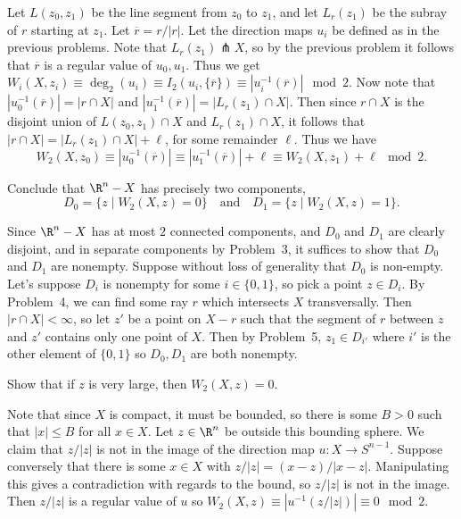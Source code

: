 \documentclass[11pt,letterpaper]{article}
\begin{document}
\begin{solution}
    \quad Let $L(z_0, z_1)$ be the line segment from $z_0$ to $z_1$, and let $L_r(z_1)$ be the subray of $r$ starting at $z_1$. Let $\overline{r}= r / |r|$. Let the direction maps $u_i$ be defined as in the previous problems. Note that $L_r(z_1)\pitchfork X$, so by the previous problem it follows that $\overline{r}$ is a regular value of $u_0, u_1$. Thus we get $W_i(X, z_i)\equiv \deg_2(u_i)\equiv I_2(u_i, \{\overline{r}\})\equiv |u_i^{-1}(\overline{r})|\mod 2$. Now note that $|u_0^{-1}(\overline{r})| = |r\cap X|$ and $|u_1^{-1}(\overline{r})| = |L_r(z_1) \cap X|$. Then since $r \cap X$ is the disjoint union of $L(z_0, z_1) \cap X$ and $L_r(z_1) \cap X$, it follows that $|r \cap X| = |L_r(z_1) \cap X|+\ell$, for some remainder $\ell$. Thus we have
    \[
    W_2(X,z_0) \equiv |u_0^{-1}(\overline{r})| \equiv |u_1^{-1}(\overline{r})|+\ell \equiv W_2(X,z_1)+\ell \mod 2.
    \]    
\end{solution}

\begin{problem}
Conclude that $\R^n-X$ has precisely two components,
\[
    D_0 = \{z \mid W_2(X,z)=0\}\quad\text{and}\quad D_1 = \{z \mid W_2(X,z)=1\}.
\]
\end{problem}

\begin{solution}
    \quad Since $\R^n-X$ has at most $2$ connected components, and $D_0$ and $D_1$ are clearly disjoint, and in separate components by Problem~3, it suffices to show that $D_0$ and $D_1$ are nonempty. Suppose without loss of generality that $D_0$ is non-empty. Let's suppose $D_i$ is nonempty for some $i\in \{0,1\}$, so pick a point $z\in D_i$. By Problem~4, we can find some ray $r$ which intersects $X$ transversally. Then $|r\cap X|<\infty$, so let $z'$ be a point on $X-r$ such that the segment of $r$ between $z$ and $z'$ contains only one point of $X$. Then by Problem~5, $z_1\in D_{i'}$ where $i'$ is the other element of $\{0,1\}$ so $D_0, D_1$ are both nonempty.
\end{solution}
    
\begin{problem}
Show that if $z$ is very large, then $W_2(X,z)=0$.
\end{problem}

\begin{solution}
    \quad Note that since $X$ is compact, it must be bounded, so there is some $B>0$ such that $|x|\leq B$ for all $x\in X$. Let $z\in \R^n$ be outside this bounding sphere. We claim that $z/|z|$ is not in the image of the direction map $u : X \to S^{n-1}$. Suppose conversely that there is some $x\in X$ with $z / |z| = (x-z) / |x-z|$. Manipulating this gives a contradiction with regards to the bound, so $z / |z|$ is not in the image. Then $z/|z|$ is a regular value of $u$ so $W_2(X,z)\equiv |u^{-1}(z /|z|)|\equiv 0\mod 2$.
\end{solution}
\end{document}
